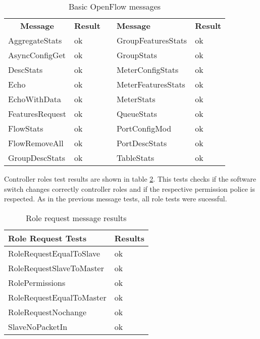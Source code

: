 \begin{table}[h]
\centering
\caption{Basic OpenFlow messages}
\label{tab:oftestbasic}
\begin{tabular}{|l|l|l|l|l|}
\cline{1-2} \cline{4-5}
\multicolumn{1}{|c|}{\textbf{Message}} & \textbf{Result} &  & \textbf{Message}   & \textbf{Result} \\ \cline{1-2} \cline{4-5} 
AggregateStats                         & ok              &  & GroupFeaturesStats & ok              \\ \cline{1-2} \cline{4-5} 
AsyncConfigGet                         & ok              &  & GroupStats         & ok              \\ \cline{1-2} \cline{4-5} 
DescStats                              & ok              &  & MeterConfigStats   & ok              \\ \cline{1-2} \cline{4-5} 
Echo                                   & ok              &  & MeterFeaturesStats & ok              \\ \cline{1-2} \cline{4-5} 
EchoWithData                           & ok              &  & MeterStats         & ok              \\ \cline{1-2} \cline{4-5} 
FeaturesRequest                        & ok              &  & QueueStats         & ok              \\ \cline{1-2} \cline{4-5} 
FlowStats                              & ok              &  & PortConfigMod      & ok              \\ \cline{1-2} \cline{4-5} 
FlowRemoveAll                          & ok              &  & PortDescStats      & ok              \\ \cline{1-2} \cline{4-5} 
GroupDescStats                         & ok              &  & TableStats         & ok              \\ \cline{1-2} \cline{4-5} 
\end{tabular}
\end{table}

Controller roles test results are shown in table \ref{tab:oftestrole}. This tests checks if the software switch changes correctly controller roles and if the respective permission police is respected. As in the previous message tests, all role tests were sucessful.    

\begin{table}[h]
\centering
\caption{Role request message results}
\label{tab:oftestrole}
\begin{tabular}{|l|l|}
\hline
\textbf{Role Request Tests} & \textbf{Results} \\ \hline
RoleRequestEqualToSlave     & ok               \\ \hline
RoleRequestSlaveToMaster    & ok               \\ \hline
RolePermissions             & ok               \\ \hline
RoleRequestEqualToMaster    & ok               \\ \hline
RoleRequestNochange         & ok               \\ \hline
SlaveNoPacketIn             & ok               \\ \hline
\end{tabular}
\end{table}

